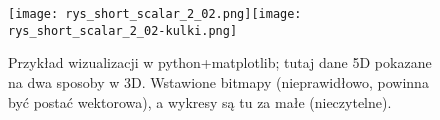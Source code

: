 \documentclass{article}
\begin{document}
\begin{figure}
\begin{center}
\texttt{[image: rys\_short\_scalar\_2\_02.png]}\hfill\texttt{[image: rys\_short\_scalar\_2\_02-kulki.png]}
\end{center}
\caption{Przykład wizualizacji w python+matplotlib; tutaj dane 5D pokazane na dwa sposoby w 3D. Wstawione bitmapy (nieprawidłowo, powinna być postać wektorowa), a wykresy są tu za małe (nieczytelne).}
\label{fig:matplotlib}
\end{figure}

\clearpage %








\end{document}
